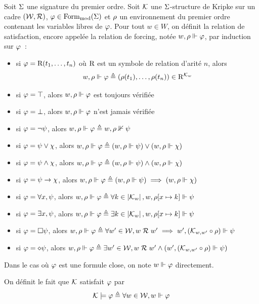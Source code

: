 \begin{definition}
  Soit $\Sigma$ une signature du premier ordre.
  Soit $\mathcal{K}$ une $\Sigma$-structure de Kripke sur un cadre $(\mathcal{W},\mathrel{\mathcal{R}})$,
  $\varphi \in \operatorname{Form}_{\mathrm{mod}}(\Sigma)$ et $\rho$ un environnement du premier ordre
  contenant les variables libres de $\varphi$. Pour tout $w \in W$, on
  définit la relation de satisfaction, encore appelée la relation de forcing,
  notée $w,\rho\Vdash \varphi$, par induction sur $\varphi$~:
  \begin{itemize}
  \item si $\varphi = \mathrm{R}(t_1,\ldots,t_n)$ où $\mathrm{R}$ est un symbole de
    relation d'arité $n$, alors
    \[w,\rho\Vdash\varphi \triangleq
    (\rho(t_1),\ldots,\rho(t_n)) \in \mathrm{R}^{\mathcal{K}_{w}}\]
  \item si $\varphi = \top$, alors $w,\rho\Vdash \varphi$ est toujours vérifiée
  \item si $\varphi = \bot$, alors $w,\rho\Vdash \varphi$ n'est jamais vérifiée
  \item si $\varphi = \lnot \psi$, alors
    $w,\rho\Vdash\varphi \triangleq w,\rho\nVdash\psi$
  \item si $\varphi = \psi \lor \chi$, alors
    $w,\rho\Vdash\varphi \triangleq (w,\rho\Vdash \psi)\lor(w,\rho\Vdash\chi)$
  \item si $\varphi = \psi \land \chi$, alors
    $w,\rho\Vdash\varphi \triangleq (w,\rho\Vdash \psi)\land(w,\rho\Vdash\chi)$
  \item si $\varphi = \psi \to \chi$, alors
    $w,\rho\Vdash\varphi \triangleq (w,\rho\Vdash \psi)\implies(w,\rho\Vdash\chi)$
  \item si $\varphi = \forall x, \psi$, alors
    $w,\rho\Vdash\varphi \triangleq \forall k \in \left\vert \mathcal{K}_w\right\vert,
    w,\rho[x \mapsto k]\Vdash \psi$
  \item si $\varphi = \exists x, \psi$, alors
    $w,\rho\Vdash\varphi \triangleq \exists k \in \left\vert \mathcal{K}_w\right\vert,
    w,\rho[x \mapsto k]\Vdash \psi$
  \item si $\varphi = \mathbin{\square} \psi$, alors
    $w,\rho\Vdash\varphi \triangleq \forall w' \in \mathcal{W}, w\mathrel{\mathcal{R}} w' \implies
    w',(\mathcal{K}_{w,w'}\circ \rho)\Vdash\psi$
  \item si $\varphi = \mathbin{\diamond} \psi$, alors
    $w,\rho\Vdash\varphi \triangleq \exists w' \in \mathcal{W}, w\mathrel{\mathcal{R}} w' \land
    (w',(\mathcal{K}_{w,w'}\circ \rho)\Vdash\psi)$
  \end{itemize}
  Dans le cas où $\varphi$ est une formule close, on note $w\Vdash\varphi$
  directement.

  On définit le fait que $\mathcal{K}$ satisfait $\varphi$ par
  \[\mathcal{K}\models \varphi \triangleq \forall w \in \mathcal{W}, w\Vdash \varphi\]
  \index[notation]{$\forc$}
\end{definition}

